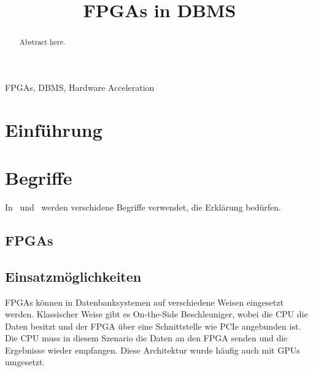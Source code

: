 \documentclass[conference]{IEEEtran}
\begin{document}

\title{FPGAs in DBMS
}

\author{
}

\maketitle

\begin{abstract}
    Abstract here.
\end{abstract}

\begin{IEEEkeywords}
    FPGAs, DBMS, Hardware Acceleration
\end{IEEEkeywords}

\section{Einführung}


\section{Begriffe}
In~\cite{li_bitweaving_2013} und~\cite{lisa_column_2018} werden verschidene Begriffe verwendet, die Erklärung bedürfen.


\subsection{FPGAs}


\subsection{Einsatzmöglichkeiten}

FPGAs können in Datenbanksystemen auf verschiedene Weisen eingesetzt werden. Klassischer Weise gibt es On-the-Side Beschleuniger, wobei die CPU die Daten
besitzt und der FPGA über eine Schnittstelle wie PCIe angebunden ist. Die CPU muss in diesem Szenario die Daten an den FPGA senden und die Ergebnisse wieder
empfangen. Diese Architektur wurde häufig auch mit GPUs umgesetzt.
\end{document}
